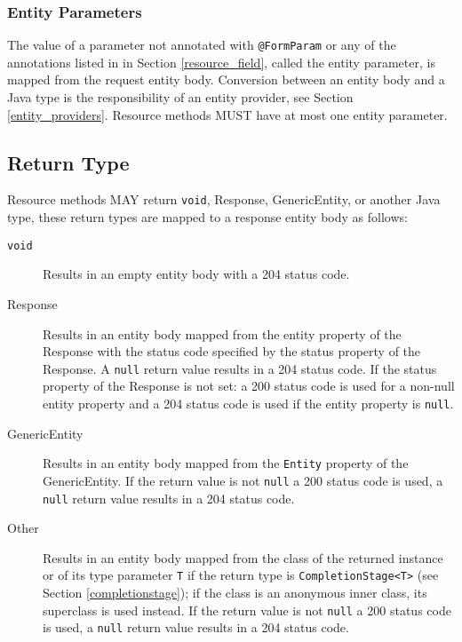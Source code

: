 \subsubsection{Entity Parameters}
\label{entity_parameters}

The value of a parameter not annotated with \lstinline{@FormParam} or any of the annotations listed in in Section
\ref{resource_field}, called the entity parameter, is mapped from the request entity body. Conversion between an entity
body and a Java type is the responsibility of an entity provider, see Section \ref{entity_providers}. Resource methods
MUST have at most one entity parameter.

\subsection{Return Type}
\label{resource_method_return}

\textcolor{highlight green}{Resource methods MAY return \lstinline{void}, Response, GenericEntity, or another Java
type}, these return types are mapped to a response entity body as follows:

\begin{description}
    \item[\lstinline{void}] Results in an empty entity body with a 204 status code.
    \item[Response] Results in an entity body mapped from the entity property of the Response with the status code
    specified by the status property of the Response. A \lstinline{null} return value results in a 204 status code.
    If the status property of the Response is not set: a 200 status code is used for a non-null entity property and a
    204 status code is used if the entity property is \lstinline{null}.
    \item[GenericEntity] Results in an entity body mapped from the \lstinline{Entity} property of the GenericEntity. If
    the return value is not \lstinline{null} a 200 status code is used, a \lstinline{null} return value results in a 204
    status code.
    \item[Other] Results in an entity body mapped from the class of the returned instance or of its type parameter
    \lstinline{T} if the return type is \lstinline{CompletionStage<T>} (see Section \ref{completionstage}); if the class
    is an anonymous inner class, its superclass is used instead. If the return value is not \lstinline{null} a 200
    status code is used, a \lstinline{null} return value results in a 204 status code.
\end{description}

